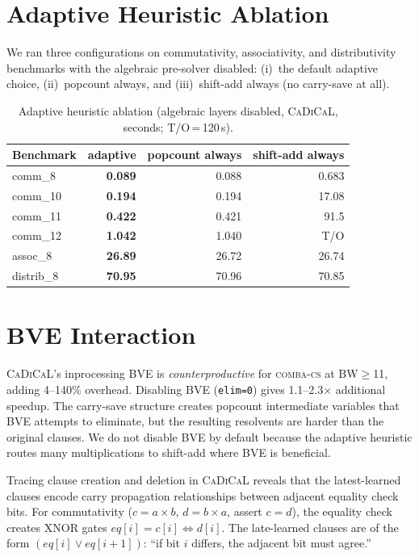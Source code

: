 \documentclass[a4paper]{ceurart}
\newcommand{\combacs}{\textsc{comba-cs}\xspace}
\newcommand{\cadical}{\textsc{CaDiCaL}\xspace}
\begin{document}
\section{Adaptive Heuristic Ablation}
\label{app:heuristic}

We ran three configurations on commutativity, associativity, and
distributivity benchmarks with the algebraic pre-solver disabled:
(i)~the default adaptive choice, (ii)~popcount always, and
(iii)~shift-add always (no carry-save at all).

\begin{table}[ht]
\caption{Adaptive heuristic ablation (algebraic layers disabled,
  \cadical, seconds; T/O\,=\,120\,s).}
\label{tab:heuristic}
\centering
\small
\begin{tabular}{lrrr}
\toprule
Benchmark & adaptive & popcount always & shift-add always \\
\midrule
comm\_8 & \textbf{0.089} & 0.088 & 0.683 \\
comm\_10 & \textbf{0.194} & 0.194 & 17.08 \\
comm\_11 & \textbf{0.422} & 0.421 & 91.5 \\
comm\_12 & \textbf{1.042} & 1.040 & T/O \\
assoc\_8 & \textbf{26.89} & 26.72 & 26.74 \\
distrib\_8 & \textbf{70.95} & 70.96 & 70.85 \\
\bottomrule
\end{tabular}
\end{table}


\section{BVE Interaction}
\label{app:bve}
\label{sec:bve}

\cadical's inprocessing BVE is \emph{counterproductive} for \combacs
at BW$\geq$11, adding 4--140\% overhead. Disabling BVE
(\texttt{elim=0}) gives 1.1--2.3$\times$ additional speedup. The
carry-save structure creates popcount intermediate variables that BVE
attempts to eliminate, but the resulting resolvents are harder than the
original clauses. We do not disable BVE by default because the
adaptive heuristic routes many multiplications to shift-add where
BVE is beneficial.

Tracing clause creation and deletion in \cadical reveals that the
latest-learned clauses encode carry propagation relationships between
adjacent equality check bits. For commutativity ($c = a \times b$,
$d = b \times a$, assert $c = d$), the equality check creates XNOR
gates $\mathit{eq}[i] = c[i] \Leftrightarrow d[i]$. The late-learned
clauses are of the form $(\mathit{eq}[i] \vee \mathit{eq}[i{+}1])$:
``if bit $i$ differs, the adjacent bit must agree.''
\end{document}
